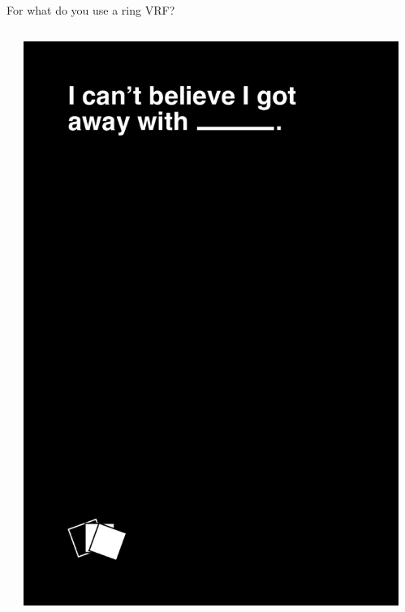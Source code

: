 \documentclass{beamer}
\begin{document}
\begin{frame}

For what do you use a ring VRF?

\bigskip\bigskip


\begin{columns}
        \begin{column}[t]{0.1\textwidth}
        \end{column}
        \begin{column}[t]{0.3\textwidth}
                \includegraphics[width=.9\textwidth]{../images/black_FRONT012.png} %
        \end{column}
        \begin{column}[t]{0.3\textwidth}

\end{column}
\end{columns}
\end{frame}
\end{document}
